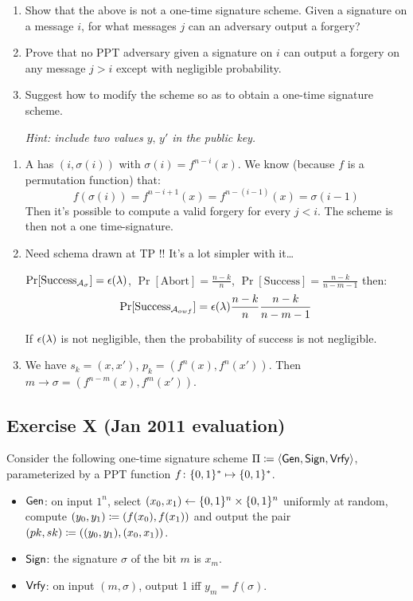 \begin{enumerate}
	\item Show that the above is not a one-time signature scheme. Given
	a signature on a message $i$, for what messages $j$ can an
	adversary output a forgery?
	\item Prove that no PPT adversary given a signature on $i$
	can output a forgery on any message $j>i$ except with negligible
	probability.
	\item Suggest how to modify the scheme so as to obtain a one-time
	signature scheme.

	\emph{Hint: include two values $y,\,y'$ in the public key.}
\end{enumerate}


\begin{solution}
	\begin{enumerate}
		\item
		A has $(i, \sigma(i))$ with $\sigma (i) = f^{n-i} (x)$. We know (because $f$ is a permutation function) that:
		\[f(\sigma(i)) = f^{n-i+1}(x) = f^{n-(i-1)}(x) = \sigma(i-1)\]
		Then it's possible to compute a valid forgery for every $j < i$. The scheme is then not a one time-signature.
		\item
		Need schema drawn at TP !! It's a lot simpler with it\dots

		$\Pr[\text{Success}_{\mathcal{A}_\sigma}] = \epsilon(\lambda)$, $\Pr[\text{Abort}] = \frac{n-k}{n}$, $\Pr[\text{Success}] = \frac{n-k}{n-m-1}$ then:
		\[\Pr[\text{Success}_{\mathcal{A}_{owf}}] = \epsilon(\lambda) \frac{n-k}{n} \frac{n-k}{n-m-1}\]

		If $\epsilon(\lambda)$ is not negligible, then the probability of success is not negligible.
		\item
		We have $s_k = (x, x')$, $p_k = (f^n(x), f^n(x'))$.
		Then $m \rightarrow \sigma = (f^{n-m}(x), f^m(x'))$.

	\end{enumerate}
\end{solution}



\subsection{Exercise X (Jan 2011 evaluation)}

Consider the following one-time signature scheme $\Pi \coloneqq \langle \operatorname{\mathsf{Gen}},
\operatorname{\mathsf{Sign}}, \operatorname{\mathsf{Vrfy}}\rangle$, parameterized by a PPT function $f\colon \{0, 1\}^*
\mapsto \{0, 1\}^*$.
\begin{itemize}
	\item $\operatorname{\mathsf{Gen}}$: on input $1^n$, select $(x_0,x_1) \leftarrow
	\{0, 1\}^n\times \{0, 1\}^n$ uniformly at random, compute $(y_0,y_1) \coloneqq
	(f(x_0),f(x_1))$ and output the pair $(pk,sk) \coloneqq
	((y_0,y_1),(x_0,x_1))$.
	\item $\operatorname{\mathsf{Sign}}$: the signature $\sigma$ of the bit $m$ is $x_m$.
	\item $\operatorname{\mathsf{Vrfy}}$: on input $(m,\sigma)$, output 1 iff $y_m = f(\sigma)$.
\end{itemize}

